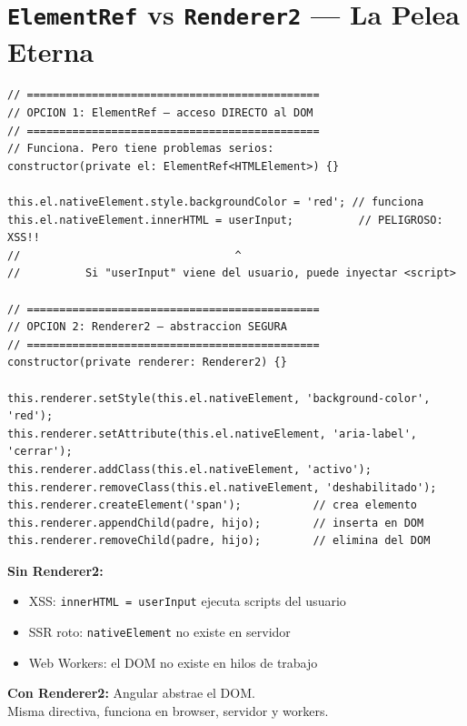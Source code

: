 \documentclass[12pt, a4paper]{article}
\begin{document}
\section{  \texttt{ElementRef} vs \texttt{Renderer2} --- La Pelea Eterna}

\begin{lstlisting}
// =============================================
// OPCION 1: ElementRef — acceso DIRECTO al DOM
// =============================================
// Funciona. Pero tiene problemas serios:
constructor(private el: ElementRef<HTMLElement>) {}

this.el.nativeElement.style.backgroundColor = 'red'; // funciona
this.el.nativeElement.innerHTML = userInput;          // PELIGROSO: XSS!!
//                                 ^
//          Si "userInput" viene del usuario, puede inyectar <script>

// =============================================
// OPCION 2: Renderer2 — abstraccion SEGURA
// =============================================
constructor(private renderer: Renderer2) {}

this.renderer.setStyle(this.el.nativeElement, 'background-color', 'red');
this.renderer.setAttribute(this.el.nativeElement, 'aria-label', 'cerrar');
this.renderer.addClass(this.el.nativeElement, 'activo');
this.renderer.removeClass(this.el.nativeElement, 'deshabilitado');
this.renderer.createElement('span');           // crea elemento
this.renderer.appendChild(padre, hijo);        // inserta en DOM
this.renderer.removeChild(padre, hijo);        // elimina del DOM
\end{lstlisting}

\begin{tcolorbox}[peligro, title={\emoji{warning} \emoji{police-car-light} Por Qué Renderer2 es Obligatorio}]
  \textbf{Sin Renderer2:}
  \begin{itemize}
    \item {} XSS: \texttt{innerHTML = userInput} ejecuta scripts del usuario
    \item {} SSR roto: \texttt{nativeElement} no existe en servidor
    \item {} Web Workers: el DOM no existe en hilos de trabajo
  \end{itemize}
  \textbf{Con Renderer2:} Angular abstrae el DOM.\\
  Misma directiva, funciona en browser, servidor y workers.
\end{tcolorbox}
\end{document}

